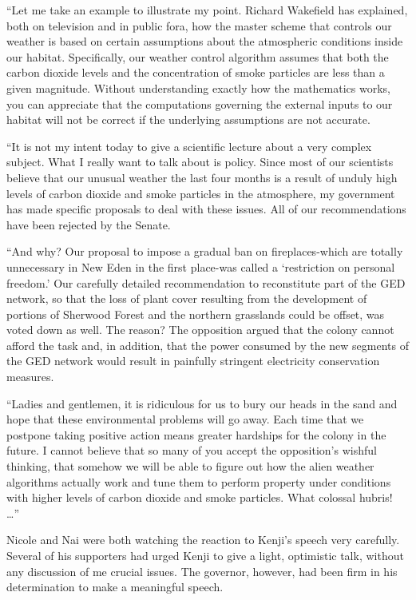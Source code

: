 \documentclass[]{article}
\begin{document}
{“Let me take an example to illustrate my point. Richard Wakefield has explained, both on television and in public fora, how the master scheme that controls our weather is based on certain assumptions about the atmospheric conditions inside our habitat. Specifically, our weather control algorithm assumes that both the carbon dioxide levels and the concentration of smoke particles are less than a given magnitude. Without understanding exactly how the mathematics works, you can appreciate that the computations governing the external inputs to our habitat will not be correct if the underlying assumptions are not accurate.

“It is not my intent today to give a scientific lecture about a very complex subject. What I really want to talk about is policy. Since most of our scientists believe that our unusual weather the last four months is a result of unduly high levels of carbon dioxide and smoke particles in the atmosphere, my government has made specific proposals to deal with these issues. All of our recommendations have been rejected by the Senate.

“And why? Our proposal to impose a gradual ban on fireplaces-which are totally unnecessary in New Eden in the first place-was called a ‘restriction on personal freedom.’ Our carefully detailed recommendation to reconstitute part of the GED network, so that the loss of plant cover resulting from the development of portions of Sherwood Forest and the northern grasslands could be offset, was voted down as well. The reason? The opposition argued that the colony cannot afford the task and, in addition, that the power consumed by the new segments of the GED network would result in painfully stringent electricity conservation measures.

“Ladies and gentlemen, it is ridiculous for us to bury our heads in the sand and hope that these environmental problems will go away. Each time that we postpone taking positive action means greater hardships for the colony in the future. I cannot believe that so many of you accept the opposition’s wishful thinking, that somehow we will be able to figure out how the alien weather algorithms actually work and tune them to perform property under conditions with higher levels of carbon dioxide and smoke particles. What colossal hubris! …”

Nicole and Nai were both watching the reaction to Kenji’s speech very carefully. Several of his supporters had urged Kenji to give a light, optimistic talk, without any discussion of me crucial issues. The governor, however, had been firm in his determination to make a meaningful speech.

}
\end{document}
